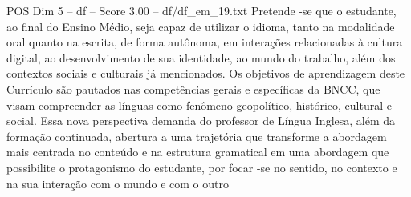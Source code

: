 \begin{textsample}{POS Dim 5 – df – Score 3.00 – df/df\_em\_19.txt}
Pretende -se que o estudante, ao final do Ensino Médio, seja capaz de utilizar o idioma, tanto na modalidade oral quanto na escrita, de forma autônoma, em interações relacionadas à cultura digital, ao desenvolvimento de sua identidade, ao mundo do trabalho, além dos contextos sociais e culturais já mencionados.
Os objetivos de aprendizagem deste Currículo são pautados nas competências gerais e específicas da BNCC, que visam compreender as línguas como fenômeno geopolítico, histórico, cultural e social.
Essa nova perspectiva demanda do professor de Língua Inglesa, além da formação continuada, abertura a uma trajetória que transforme a abordagem mais centrada no conteúdo e na estrutura gramatical em uma abordagem que possibilite o protagonismo do estudante, por focar -se no sentido, no contexto e na sua interação com o mundo e com o outro

\end{textsample}

